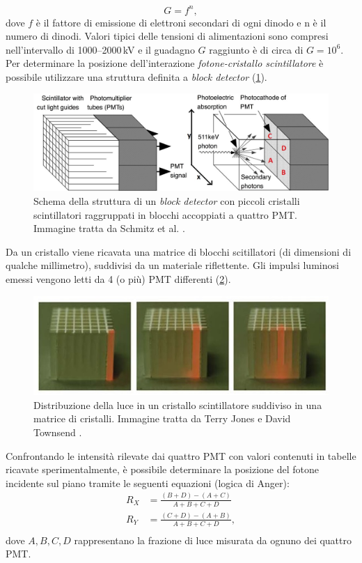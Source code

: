 \begin{equation}
	G = f^n,
\end{equation}
dove $f$ è il fattore di emissione di elettroni secondari di ogni dinodo e n è il numero di dinodi. Valori tipici delle tensioni di alimentazioni sono  compresi nell'intervallo di \numrange[range-phrase=--]{1000}{2000}\,\unit{\kilo\volt} e il guadagno $G$ raggiunto è di circa di $G=10^6$. Per determinare la posizione dell'interazione \textit{fotone-cristallo scintillatore} è possibile utilizzare una struttura definita a \textit{block detector} (\Fig\ref{fig:block_detector}).
\begin{figure}[t]
	\centering
	\includegraphics[width=0.8\linewidth]{./ImageFiles/block_detector.jpg}
	\caption{Schema della struttura di un \textit{block detector} con piccoli cristalli scintillatori raggruppati in blocchi accoppiati a quattro PMT. Immagine tratta da Schmitz et al. \cite{Schmitz2013ThePO}.} 
	\label{fig:block_detector}
\end{figure}
Da un cristallo viene ricavata una matrice di blocchi scitillatori (di dimensioni di qualche millimetro), suddivisi da un materiale riflettente. Gli impulsi luminosi emessi vengono letti da 4 (o più) PMT differenti (\Fig\ref{fig:block_detector_cube}).
\begin{figure}[b]
	\centering
	\includegraphics[width=0.6\linewidth]{./ImageFiles/block_detector_lightoncube.jpg}
	\caption{Distribuzione della luce in un cristallo scintillatore suddiviso in una matrice di cristalli. Immagine tratta da Terry Jones e David Townsend \cite{Jones2017}.} 
	\label{fig:block_detector_cube}
\end{figure}
Confrontando le intensità rilevate dai quattro PMT con valori contenuti in tabelle ricavate sperimentalmente, è possibile determinare la posizione del fotone incidente sul piano tramite le seguenti equazioni \cite{Bailey2014} (logica di Anger):
\begin{equation}
	\begin{split}
		R_X&=\frac{(B+D)-(A+C)}{A+B+C+D} \\
		R_Y&=\frac{(C+D)-(A+B)}{A+B+C+D}, \\
	\end{split}
\end{equation}
dove $A,B,C,D$ rappresentano la frazione di luce misurata da ognuno dei quattro PMT.


